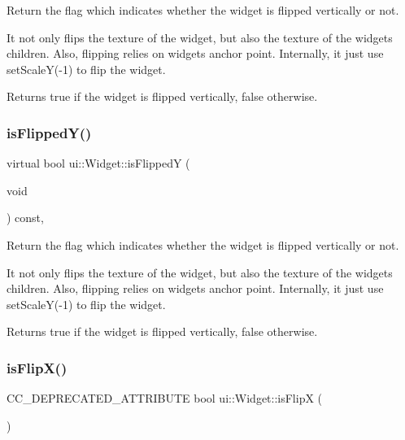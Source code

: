 Return the flag which indicates whether the widget is flipped vertically or not.

It not only flips the texture of the widget, but also the texture of the widget\textquotesingle{}s children. Also, flipping relies on widget\textquotesingle{}s anchor point. Internally, it just use set\+ScaleY(-\/1) to flip the widget.

\begin{DoxyReturn}{Returns}
true if the widget is flipped vertically, false otherwise. 
\end{DoxyReturn}
\mbox{\label{classui_1_1Widget_a25f551f2348e0f7b953d682045b10325}} 
\subsubsection{\texorpdfstring{is\+Flipped\+Y()}{isFlippedY()}\hspace{0.1cm}{\footnotesize\ttfamily [2/2]}}
{\footnotesize\ttfamily virtual bool ui\+::\+Widget\+::is\+FlippedY (\begin{DoxyParamCaption}\item[{void}]{ }\end{DoxyParamCaption}) const\hspace{0.3cm}{\ttfamily [inline]}, {\ttfamily [virtual]}}

Return the flag which indicates whether the widget is flipped vertically or not.

It not only flips the texture of the widget, but also the texture of the widget\textquotesingle{}s children. Also, flipping relies on widget\textquotesingle{}s anchor point. Internally, it just use set\+ScaleY(-\/1) to flip the widget.

\begin{DoxyReturn}{Returns}
true if the widget is flipped vertically, false otherwise. 
\end{DoxyReturn}
\mbox{\label{classui_1_1Widget_a21bb179e181b815212a32d4ab5b53f93}} 
\subsubsection{\texorpdfstring{is\+Flip\+X()}{isFlipX()}\hspace{0.1cm}{\footnotesize\ttfamily [1/2]}}
{\footnotesize\ttfamily C\+C\+\_\+\+D\+E\+P\+R\+E\+C\+A\+T\+E\+D\+\_\+\+A\+T\+T\+R\+I\+B\+U\+TE bool ui\+::\+Widget\+::is\+FlipX (\begin{DoxyParamCaption}{ }\end{DoxyParamCaption})\hspace{0.3cm}{\ttfamily [inline]}}


